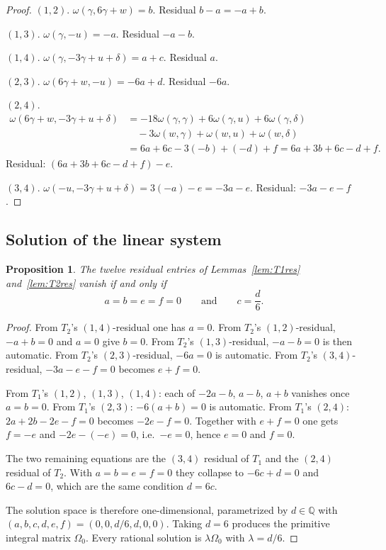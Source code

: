 \documentclass[11pt,a4paper]{article}
\newtheorem{proposition}{Proposition}
\theoremstyle{definition}
\theoremstyle{remark}
\newcommand{\Q}{\mathbb{Q}}
\begin{document}
\begin{proof}
$(1,2)$. $\omega(\gamma,6\gamma+w)=b$. Residual $b-a=-a+b$.

$(1,3)$. $\omega(\gamma,-u)=-a$. Residual $-a-b$.

$(1,4)$. $\omega(\gamma,-3\gamma+u+\delta)=a+c$. Residual $a$.

$(2,3)$. $\omega(6\gamma+w,-u)=-6a+d$. Residual $-6a$.

$(2,4)$.
\begin{align*}
\omega(6\gamma+w,-3\gamma+u+\delta)
&=-18\omega(\gamma,\gamma)+6\omega(\gamma,u)+6\omega(\gamma,\delta)\\
&\quad-3\omega(w,\gamma)+\omega(w,u)+\omega(w,\delta)\\
&=6a+6c-3(-b)+(-d)+f=6a+3b+6c-d+f.
\end{align*}
Residual: $(6a+3b+6c-d+f)-e$.

$(3,4)$. $\omega(-u,-3\gamma+u+\delta)=3(-a)-e=-3a-e$. Residual: $-3a-e-f$.
\end{proof}

\subsection{Solution of the linear system}

\begin{proposition}\label{prop:kernel}
The twelve residual entries of Lemmas~\ref{lem:T1res} and~\ref{lem:T2res} vanish if and only if
\[
a=b=e=f=0\qquad\text{and}\qquad c=\frac{d}{6}.
\]
\end{proposition}

\begin{proof}
From $T_2$'s $(1,4)$-residual one has $a=0$. From $T_2$'s $(1,2)$-residual, $-a+b=0$ and $a=0$ give $b=0$. From $T_2$'s $(1,3)$-residual, $-a-b=0$ is then automatic. From $T_2$'s $(2,3)$-residual, $-6a=0$ is automatic. From $T_2$'s $(3,4)$-residual, $-3a-e-f=0$ becomes $e+f=0$.

From $T_1$'s $(1,2)$, $(1,3)$, $(1,4)$: each of $-2a-b$, $a-b$, $a+b$ vanishes once $a=b=0$. From $T_1$'s $(2,3)$: $-6(a+b)=0$ is automatic. From $T_1$'s $(2,4)$: $2a+2b-2e-f=0$ becomes $-2e-f=0$. Together with $e+f=0$ one gets $f=-e$ and $-2e-(-e)=0$, i.e.\ $-e=0$, hence $e=0$ and $f=0$.

The two remaining equations are the $(3,4)$ residual of $T_1$ and the $(2,4)$ residual of $T_2$. With $a=b=e=f=0$ they collapse to $-6c+d=0$ and $6c-d=0$, which are the same condition $d=6c$.

The solution space is therefore one-dimensional, parametrized by $d\in\Q$ with $(a,b,c,d,e,f)=(0,0,d/6,d,0,0)$. Taking $d=6$ produces the primitive integral matrix $\Omega_0$. Every rational solution is $\lambda\Omega_0$ with $\lambda=d/6$.
\end{proof}
\end{document}
